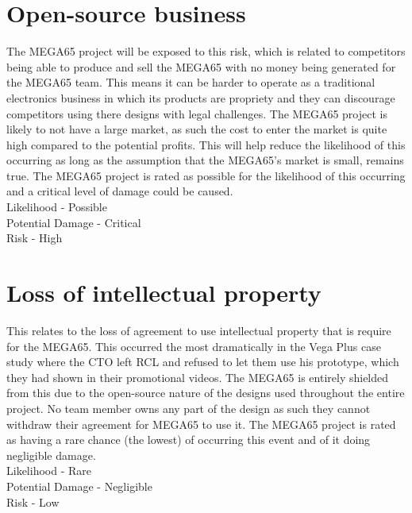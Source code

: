\section{Open-source business}
The MEGA65 project will be exposed to this risk, which is related to competitors being able to produce and sell the MEGA65 with no money being generated for the MEGA65 team. This means it can be harder to operate as a traditional electronics business in which its products are propriety and they can discourage competitors using there designs with legal challenges. The MEGA65 project is likely to not have a large market, as such the cost to enter the market is quite high compared to the potential profits. This will help reduce the likelihood of this occurring as long as the assumption that the MEGA65's market is small, remains true. The MEGA65 project is rated as possible for the likelihood of this occurring and a critical level of damage could be caused. \\

Likelihood - Possible \\
Potential Damage - Critical \\
Risk - High \\


\section{Loss of intellectual property}
This relates to the loss of agreement to use intellectual property that is require for the MEGA65. This occurred the most dramatically in the Vega Plus case study where the CTO left RCL and refused to let them use his prototype, which they had shown in their promotional videos. The MEGA65 is entirely shielded from this due to the open-source nature of the designs used throughout the entire project. No team member owns any part of the design as such they cannot withdraw their agreement for MEGA65 to use it. The MEGA65 project is rated as having a rare chance (the lowest) of occurring this event and of it doing negligible damage.  \\

Likelihood - Rare \\
Potential Damage - Negligible \\
Risk - Low \\


